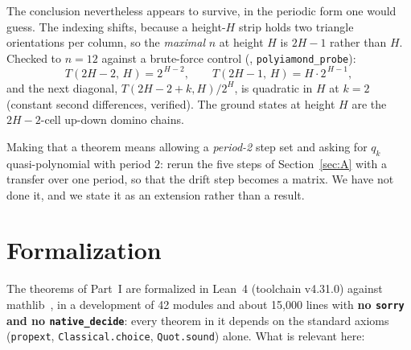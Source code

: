 \documentclass[11pt]{article}
\begin{document}
The conclusion nevertheless appears to survive, in the periodic form one would
guess. The indexing shifts, because a height-$H$ strip holds two triangle
orientations per column, so the \emph{maximal} $n$ at height $H$ is $2H-1$ rather
than $H$. Checked to $n = 12$ against a brute-force control
(, \texttt{polyiamond\_probe}):
\[
  T(2H-2,\,H) = 2^{\,H-2},
  \qquad
  T(2H-1,\,H) = H\cdot 2^{\,H-1},
\]
and the next diagonal, $T(2H-2+k, H)/2^H$, is quadratic in $H$ at $k = 2$
(constant second differences, verified). The ground states at height $H$ are the
$2H-2$-cell up-down domino chains.

Making that a theorem means allowing a \emph{period-2} step set and asking for
$q_k$ quasi-polynomial with period $2$: rerun the five steps of
Section~\ref{sec:A} with a transfer over one period, so that the drift step
becomes a matrix. We have not done it, and we state it as an extension rather
than a result.

\section{Formalization}
\label{sec:formal}

The theorems of Part~I are formalized in Lean~4 (toolchain v4.31.0) against
mathlib~\cite{mathlib}, in a development of 42 modules and about 15{,}000
lines with \textbf{no \texttt{sorry} and no
\texttt{native\_decide}}: every theorem in it depends on the standard axioms
(\texttt{propext}, \texttt{Classical.choice}, \texttt{Quot.sound}) alone. What
is relevant here:
\end{document}
